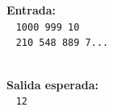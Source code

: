 \begin{frame}
    \begin{columns}
    \begin{column}{0.35\textwidth}
        \textbf{Entrada:} \\~
        \texttt{1000 999 10} \\~
        \texttt{210 548 889 7...} \\~
        
        \textbf{Salida esperada:} \\~
        \texttt{12} \\~
    \end{column}
    \begin{column}{0.75\textwidth}
    \end{column}
    \end{columns}
\end{frame}